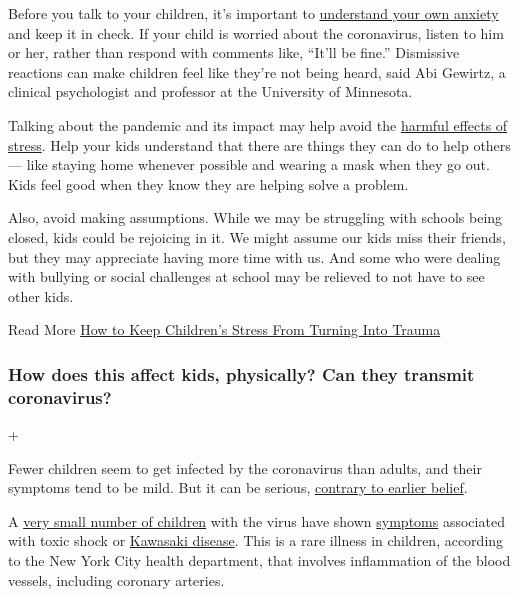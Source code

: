 Before you talk to your children, it's important to
\href{https://www.nytimes3xbfgragh.onion/2020/03/17/parenting/coronavirus-kids-talk.html}{understand
your own anxiety} and keep it in check. If your child is worried about
the coronavirus, listen to him or her, rather than respond with comments
like, ``It'll be fine.'' Dismissive reactions can make children feel
like they're not being heard, said Abi Gewirtz, a clinical psychologist
and professor at the University of Minnesota.

Talking about the pandemic and its impact may help avoid the
\href{https://www.nytimes3xbfgragh.onion/2020/05/20/us/coronavirus-young-people-emotional-toll.html}{harmful
effects of stress}. Help your kids understand that there are things they
can do to help others --- like staying home whenever possible and
wearing a mask when they go out. Kids feel good when they know they are
helping solve a problem.

Also, avoid making assumptions. While we may be struggling with schools
being closed, kids could be rejoicing in it. We might assume our kids
miss their friends, but they may appreciate having more time with us.
And some who were dealing with bullying or social challenges at school
may be relieved to not have to see other kids.

 Read More
\href{https://www.nytimes3xbfgragh.onion/2020/05/07/well/family/coronavirus-children-stress-parents.html}{How
to Keep Children's Stress From Turning Into Trauma}

\hypertarget{how-does-this-affect-kids-physically-can-they-transmit-coronavirus}{%
\subsubsection{How does this affect kids, physically? Can they transmit
coronavirus?}\label{how-does-this-affect-kids-physically-can-they-transmit-coronavirus}}

+

Fewer children seem to get infected by the coronavirus than adults, and
their symptoms tend to be mild. But it can be serious,
\href{https://www.nytimes3xbfgragh.onion/2020/05/12/well/family/coronavirus-children-covid-19.html}{contrary
to earlier belief}.

A
\href{https://www.nytimes3xbfgragh.onion/2020/05/19/parenting/pmis-coronavirus-children.html}{very
small number of children} with the virus have shown
\href{https://www.nytimes3xbfgragh.onion/article/coronavirus-symptoms.html}{symptoms}
associated with toxic shock or
\href{https://www.nytimes3xbfgragh.onion/article/kawasaki-disease-coronavirus-children.html}{Kawasaki
disease}. This is a rare illness in children, according to the New York
City health department, that involves inflammation of the blood vessels,
including coronary arteries.

